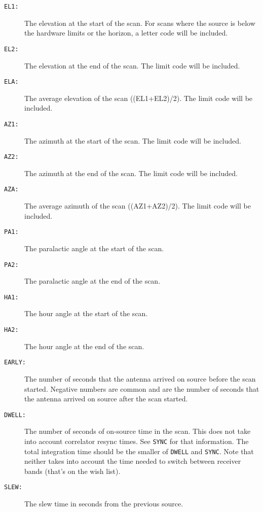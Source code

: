 \documentclass{report}
\begin{document}
\begin{description}

\item[{\tt EL1:}]  The elevation at the start of the scan.  For scans
where the source is below the hardware limits or the horizon, a letter
code will be included.

\item[{\tt EL2:}]  The elevation at the end of the scan.  The limit
code will be included.

\item[{\tt ELA:}]  The average elevation of the scan ((EL1+EL2)/2).
The limit code will be included.

\item[{\tt AZ1:}]  The azimuth at the start of the scan.  The limit
code will be included.

\item[{\tt AZ2:}]  The azimuth at the end of the scan.  The limit
code will be included.

\item[{\tt AZA:}]  The average azimuth of the scan ((AZ1+AZ2)/2).
The limit code will be included.

\item[{\tt PA1:}]  The paralactic angle at the start of the scan.

\item[{\tt PA2:}]  The paralactic angle at the end of the scan.

\item[{\tt HA1:}]  The hour angle at the start of the scan.

\item[{\tt HA2:}]  The hour angle at the end of the scan.

\item[{\tt EARLY:}]  The number of seconds that the antenna arrived on
source before the scan started.  Negative numbers are common and are the
number of seconds that the antenna arrived on source after the scan
started.

\item[{\tt DWELL:}]  The number of seconds of on-source time in the
scan.  This does not take into account correlator resync times.  See
{\tt SYNC} for that information.  The total integration time should be
the smaller of {\tt DWELL} and {\tt SYNC}.  Note that neither takes
into account the time needed to switch between receiver bands (that's
on the wish list).

\item[{\tt SLEW:}]  The slew time in seconds from the previous source.


\end{description}
\end{document}
